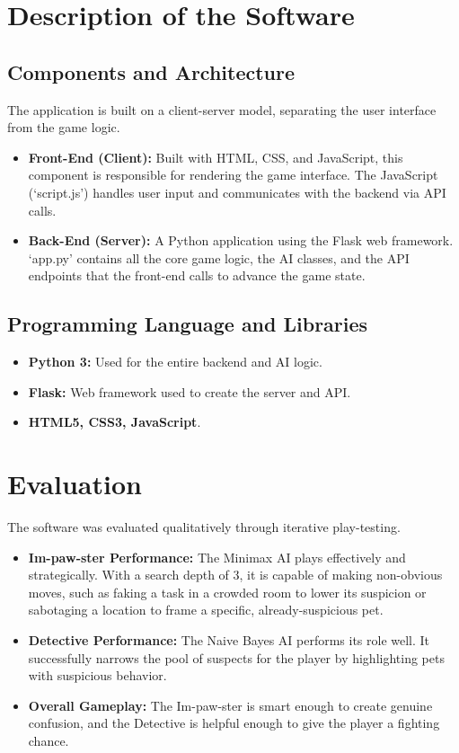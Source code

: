 \documentclass{article}
\begin{document}
\section{Description of the Software}

\subsection{Components and Architecture}
The application is built on a client-server model, separating the user interface from the game logic.

\begin{itemize}
    \item \textbf{Front-End (Client):} Built with HTML, CSS, and JavaScript, this component is responsible for rendering the game interface. The JavaScript (`script.js') handles user input and communicates with the backend via API calls.
    \item \textbf{Back-End (Server):} A Python application using the Flask web framework. `app.py' contains all the core game logic, the AI classes, and the API endpoints that the front-end calls to advance the game state.
\end{itemize}

\subsection{Programming Language and Libraries}
\begin{itemize}
    \item \textbf{Python 3:} Used for the entire backend and AI logic.
    \item \textbf{Flask:} Web framework used to create the server and API.
    \item \textbf{HTML5, CSS3, JavaScript}.
\end{itemize}

\section{Evaluation}
The software was evaluated qualitatively through iterative play-testing.

\begin{itemize}
    \item \textbf{Im-paw-ster Performance:} The Minimax AI plays effectively and strategically. With a search depth of 3, it is capable of making non-obvious moves, such as faking a task in a crowded room to lower its suspicion or sabotaging a location to frame a specific, already-suspicious pet.
    \item \textbf{Detective Performance:} The Naive Bayes AI performs its role well. It successfully narrows the pool of suspects for the player by highlighting pets with suspicious behavior.
    \item \textbf{Overall Gameplay:} The Im-paw-ster is smart enough to create genuine confusion, and the Detective is helpful enough to give the player a fighting chance.
\end{itemize}
\end{document}
